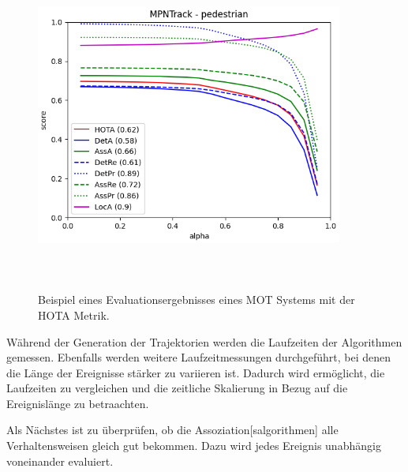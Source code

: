 \begin{figure}[htb]
    \centering
    \includegraphics[width=0.9\textwidth, height=11cm]{img/Plots/MPNTrack MOT17.png}
    \caption[Beispiel eines Evaluationsergebnisses eines MOT Systems mit der HOTA Metrik.]{Beispiel eines Evaluationsergebnisses eines MOT Systems mit der HOTA Metrik.}
    \label{fig:MPNTrack}
\end{figure}

Während der Generation der Trajektorien werden die Laufzeiten der Algorithmen gemessen. Ebenfalls werden weitere Laufzeitmessungen durchgeführt, bei denen die Länge der Ereignisse stärker zu variieren ist. Dadurch wird ermöglicht, die Laufzeiten zu vergleichen und die zeitliche Skalierung in Bezug auf die Ereignislänge zu betraachten.\par 

Als Nächstes ist zu überprüfen, ob die \gls{Assoziation}[salgorithmen] alle Verhaltensweisen 
gleich gut  bekommen. Dazu wird jedes Ereignis unabhängig voneinander evaluiert.\par
